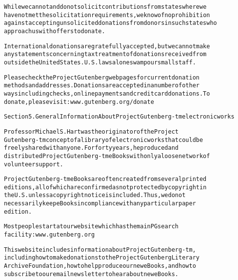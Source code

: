 \documentclass[12pt]{book}[2005/09/16]
\newenvironment{PGtext}{%
\begin{alltt}
\fontsize{9.2}{10.5}\ttfamily\selectfont}%
{\end{alltt}}
\begin{document}
\begin{PGtext}
While we cannot and do not solicit contributions from states where we
have not met the solicitation requirements, we know of no prohibition
against accepting unsolicited donations from donors in such states who
approach us with offers to donate.

International donations are gratefully accepted, but we cannot make
any statements concerning tax treatment of donations received from
outside the United States. U.S. laws alone swamp our small staff.

Please check the Project Gutenberg web pages for current donation
methods and addresses. Donations are accepted in a number of other
ways including checks, online payments and credit card donations. To
donate, please visit: www.gutenberg.org/donate

Section 5. General Information About Project Gutenberg-tm electronic works

Professor Michael S. Hart was the originator of the Project
Gutenberg-tm concept of a library of electronic works that could be
freely shared with anyone. For forty years, he produced and
distributed Project Gutenberg-tm eBooks with only a loose network of
volunteer support.

Project Gutenberg-tm eBooks are often created from several printed
editions, all of which are confirmed as not protected by copyright in
the U.S. unless a copyright notice is included. Thus, we do not
necessarily keep eBooks in compliance with any particular paper
edition.

Most people start at our website which has the main PG search
facility: www.gutenberg.org

This website includes information about Project Gutenberg-tm,
including how to make donations to the Project Gutenberg Literary
Archive Foundation, how to help produce our new eBooks, and how to
subscribe to our email newsletter to hear about new eBooks.
\end{PGtext}
\end{document}
